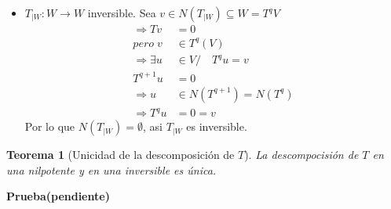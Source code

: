 \documentclass[10pt,a4paper]{article}
\newtheorem{mytheo}{Teorema}
\begin{document}
\begin{itemize}
\begin{itemize}
			Entonces $N(T^{q-1}) \neq \emptyset$, pues si $N(T^{q-1}) = \emptyset$ implicaría que $N(T^{q}) = \emptyset$. Para probar esto supongamos que $N(T^{q})\neq \emptyset$.
			$$\exists v\in N(T^{q}),\: v\neq 0/\quad T^{q}v = 0$$
			\begin{align*}
				T^{q-1}(Tv) &= 0\\
				Tv \in N(T^{q-1}) &= \{0\}\\
				Tv & = 0\\
				v & \in N(T)\subseteq N(T^{q-1})\\
				v &\in N(T^{q-1})
			\end{align*}
			Contradice que $N(T^{q-1}) = \emptyset$, por lo que $N(T^{q}) = \emptyset$
			\begin{equation}\label{minimalidad_index}
				\Rightarrow N(T^{q-1}) = N(T^{q})
			\end{equation}
			Pero $(\ref{minimalidad_index})$, contradice la minimalidad de $q\in\mathbb{N}$
			$$\therefore N(T^{q-1})\neq \emptyset$$
			Así tenemos $T^{q} v = 0,\quad\forall v\in U\quad\wedge\quad\exists u\in U/\quad T^{q-1}u\neq 0$
			$$\Rightarrow T_{|U}^{q-1}\neq 0\quad\wedge\quad T_{U}^{q} = 0$$
			$\therefore T_{|U}$ es nilpotente de índice $q$.
			
			\item $T_{|W}:W\rightarrow W$ inversible.
			Sea $v\in N(T_{|W})\subseteq W = T^{q}V$
			\begin{align*}
				\Rightarrow Tv &= 0\\
				pero\; v &\in T^{q}(V)\\
				\Rightarrow \exists u &\in V/\quad T^{q}u = v\\
				T^{q+1}u &= 0\\
				\Rightarrow u &\in N(T^{q+1}) = N(T^{q})\\
				\Rightarrow T^{q}u &= 0 = v
			\end{align*}
			Por lo que $N(T_{|W}) = \emptyset$, asi $T_{|W} $ es inversible.
		\end{itemize}
\end{itemize}


\begin{mytheo}[Unicidad de la descomposición de $T$]
La descompocisión de $T$ en una nilpotente y en una inversible es única.	
\end{mytheo}

\textbf{Prueba(pendiente)}\\
\end{document}
